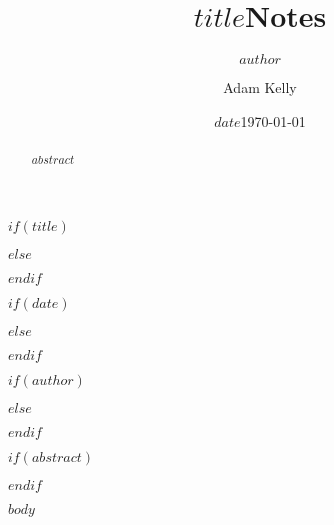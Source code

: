 \documentclass[a4paper,titlepage,onecolumn,superscriptaddress,12pt,unpublished]{quantumarticle} %
\begin{document}
$if(title)$
\title{$title$}
$else$
\title{Notes}
$endif$

$if(date)$
\date{$date$}
$else$
\date{\today}
$endif$

$if(author)$
\author{$author$}
$else$
\author{Adam Kelly}
$endif$

\maketitle

$if(abstract)$
\begin{abstract}
  $abstract$
\end{abstract}
$endif$

$body$



\end{document}

